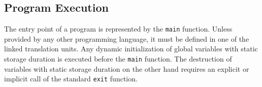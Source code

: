 \subsection{Program Execution}

The entry point of a program is represented by the \texttt{main} function.
Unless provided by any other programming language, it must be defined in one of the linked \cpp{} translation units.
Any dynamic initialization of global variables with static storage duration is executed before the \texttt{main} function.
The destruction of variables with static storage duration on the other hand requires an explicit or implicit call of the standard \texttt{exit} function.

\concludechapter

